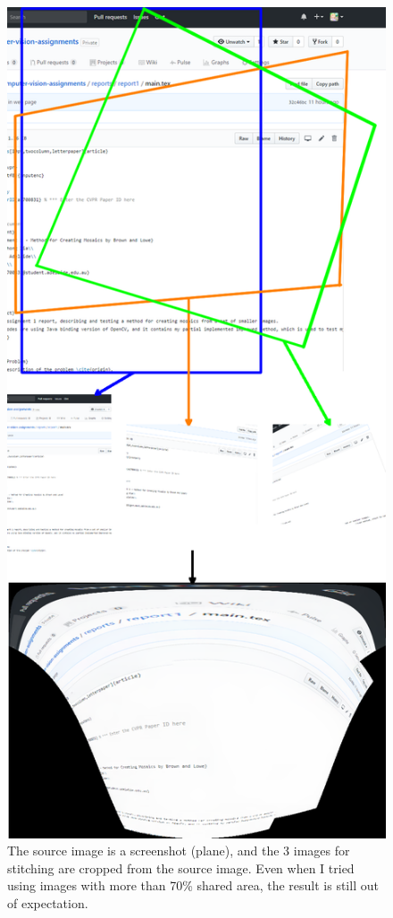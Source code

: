 \documentclass[10pt,twocolumn,letterpaper]{article}
\begin{document}
\begin{figure}[t]
    \begin{center}
        \includegraphics[width=0.9\linewidth]{fail}
    \end{center}
    \caption{The source image is a screenshot (plane), and the 3 images for stitching are cropped from the source image.
    Even when I tried using images with more than 70\% shared area, the result is still out of expectation.}
    \label{fig:fail}
\end{figure}
\end{document}
